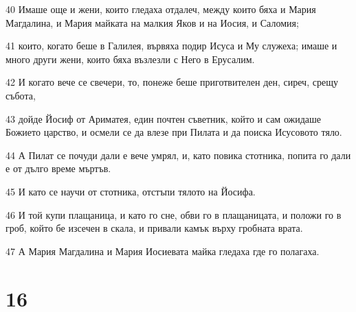 \par 40 Имаше още и жени, които гледаха отдалеч, между които бяха и Мария Магдалина, и Мария майката на малкия Яков и на Иосия, и Саломия;
\par 41 които, когато беше в Галилея, вървяха подир Исуса и Му служеха; имаше и много други жени, които бяха възлезли с Него в Ерусалим.
\par 42 И когато вече се свечери, то, понеже беше приготвителен ден, сиреч, срещу събота,
\par 43 дойде Йосиф от Ариматея, един почтен съветник, който и сам ожидаше Божието царство, и осмели се да влезе при Пилата и да поиска Исусовото тяло.
\par 44 А Пилат се почуди дали е вече умрял, и, като повика стотника, попита го дали е от дълго време мъртъв.
\par 45 И като се научи от стотника, отстъпи тялото на Йосифа.
\par 46 И той купи плащаница, и като го сне, обви го в плащаницата, и положи го в гроб, който бе изсечен в скала, и привали камък върху гробната врата.
\par 47 А Мария Магдалина и Мария Иосиевата майка гледаха где го полагаха.

\chapter{16}

